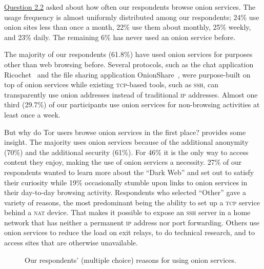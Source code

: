 \hyperref[q2_2]{Question 2.2} asked about how often our respondents browse onion
services.  The usage frequency is almost uniformly distributed among our
respondents; 24\% use onion sites less than once a month, 22\% use them about
monthly, 25\% weekly, and 23\% daily.  The remaining 6\% has never used an onion
service before.

The majority of our respondents (61.8\%) have used onion services for purposes
other than web browsing before.  Several protocols, such as the chat application
Ricochet~\cite{ricochet} and the file sharing application
OnionShare~\cite{onionshare}, were purpose-built on top of onion services while
existing \textsc{tcp}-based tools, such as \textsc{ssh}, can transparently use
onion addresses instead of traditional \textsc{ip} addresses.  Almost one third
(29.7\%) of our participants use onion services for non-browsing activities at
least once a week.

But why do Tor users browse onion services in the first place?
 provides some insight.  The majority uses onion services
because of the additional anonymity (70\%) and the additional security (61\%).
For 46\% it is the only way to access content they enjoy, making the use of
onion services a necessity.  27\% of our respondents wanted to learn more about
the ``Dark Web'' and set out to satisfy their curiosity while 19\% occasionally
stumble upon links to onion services in their day-to-day browsing activity.
Respondents who selected ``Other'' gave a variety of reasons, the most
predominant being the ability to set up a \textsc{tcp} service behind a
\textsc{nat} device.  That makes it possible to expose an \textsc{ssh} server in
a home network that has neither a permanent \textsc{ip} address nor port
forwarding.  Others use onion services to reduce the load on exit relays, to do
technical research, and to access sites that are otherwise unavailable.

\begin{figure}[t]
    \centering
    
    \caption{Our respondents' (multiple choice) reasons for using onion
    services.}
    \label{fig:onion-usage}
\end{figure}

